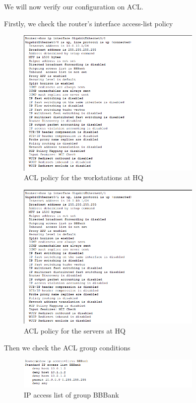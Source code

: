 We will now verify our configuration on ACL\@.

Firstly, we check the router's interface access-list policy

\begin{figure}[H]
  \centering
  \includegraphics[width=0.8\textwidth]{./assets/acl1.png}
  \caption{ACL policy for the workstations at HQ}
\end{figure}

\begin{figure}[H]
  \centering
  \includegraphics[width=0.8\textwidth]{./assets/acl2.png}
  \caption{ACL policy for the servers at HQ}
\end{figure}

Then we check the ACL group conditions

\begin{figure}[H]
  \centering
  \includegraphics[width=0.8\textwidth]{./assets/acl3.png}
  \caption{IP access list of group BBBank}
\end{figure}
